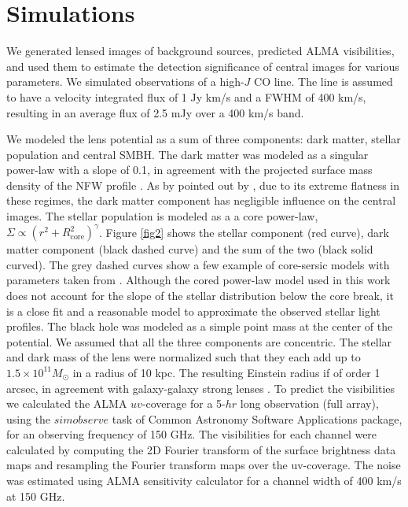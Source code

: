 \documentclass[chicago]{emulateapj}
\begin{document}
\section{Simulations}
We generated lensed images of background sources, predicted ALMA visibilities, and used them to estimate the detection significance of central images for various parameters. We simulated observations of a high-$J$ CO line. The line is assumed to have a velocity integrated flux of 1 Jy km/s and a FWHM of 400 km/s, resulting in an average flux of 2.5 mJy over a 400 km/s band. 

We modeled the lens potential as a sum of three components: dark matter, stellar population and central SMBH. The dark matter was modeled as a singular power-law with a slope of 0.1, in agreement with the projected surface mass density of the NFW profile \citep{Golse:02}. As by pointed out by \citep{Keeton:03}, due to its extreme flatness in these regimes, the dark matter component has negligible influence on the central images. 
The stellar population is modeled as a a core power-law, $\Sigma\propto (r^2+R_{\mathrm{core}}^2)^{\gamma}$. Figure \ref{fig2} shows the stellar component (red curve), dark matter component (black dashed curve) and the sum of the two (black solid curved). The grey dashed curves show a few example of core-sersic models with parameters taken from \citet{Ferrarese:06}. Although the cored power-law model used in this work does not account for the slope of the stellar distribution below the core break, it is a close fit and a reasonable model to approximate the observed stellar light profiles. 
The black hole was modeled as a simple point mass at the center of the potential. We assumed that all the three components are concentric.
The stellar and dark mass of the lens were normalized such that they each add up to $1.5\times10^11 M_{\odot}$ in a radius of 10 kpc. The resulting Einstein radius if of order 1 arcsec, in agreement with galaxy-galaxy strong lenses \citep[e.g.,][]{}.
To predict the visibilities we calculated the ALMA $uv$-coverage for a 5-$hr$ long observation (full array), using the $simobserve$ task of Common Astronomy Software Applications package, for an observing frequency of 150 GHz. 
The visibilities for each channel were calculated by computing the 2D Fourier transform of the surface brightness data maps and resampling the Fourier transform maps over the uv-coverage. 
The noise was estimated using ALMA sensitivity calculator for a channel width of 400 km/s at 150 GHz. 
\end{document}
